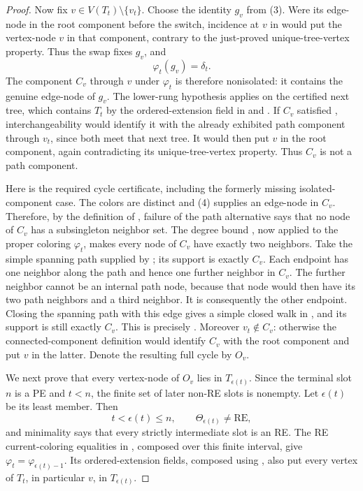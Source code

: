 \begin{proof}
Now fix \(v\in V(T_t)\setminus\{v_t\}\).  Choose the identity \(g_v\)
from (3).  Were its edge-node in the root component before the switch,
incidence at \(v\) in  would put the
vertex-node \(v\) in that component, contrary to the just-proved
unique-tree-vertex property.  Thus the swap fixes \(g_v\), and
\[
                       \varphi_t(g_v)=\delta_t .                 \tag{4}
\]
The component \(C_v\) through \(v\) under \(\varphi_t\) is therefore
nonisolated: it contains the genuine edge-node of \(g_v\).  The lower-rung
hypothesis  applies on the certified next
tree, which contains \(T_t\) by the ordered-extension field in
 and
.  If \(C_v\) satisfied
, interchangeability would identify it
with the already exhibited path component through \(v_t\), since both
meet that next tree.  It would then put \(v\) in the root component,
again contradicting its unique-tree-vertex property.  Thus \(C_v\) is
not a path component.

Here is the required cycle certificate, including the formerly missing
isolated-component case.  The colors are distinct and (4) supplies an
edge-node in \(C_v\).  Therefore, by the definition of
, failure of the path alternative says
that no node of \(C_v\) has a subsingleton neighbor set.  The degree bound
, now applied to the proper
coloring \(\varphi_t\), makes every node of \(C_v\) have exactly two
neighbors.  Take the simple spanning path supplied by
; its support is exactly \(C_v\).
Each endpoint has one neighbor along the path and hence one further
neighbor in \(C_v\).  The further neighbor cannot be an internal path
node, because that node would then have its two path neighbors and a third
neighbor.  It is consequently the other endpoint.  Closing the spanning
path with this edge gives a simple closed walk in
, and its support is still exactly \(C_v\).
This is precisely .  Moreover
\(v_t\notin C_v\): otherwise the connected-component definition
 would identify \(C_v\) with the root
component and put \(v\) in the latter.  Denote the resulting full cycle
by \(O_v\).

We next prove that every vertex-node of \(O_v\) lies in
\(T_{\epsilon(t)}\).  Since the terminal slot \(n\) is a PE and
\(t<n\), the finite set of later non-RE slots is nonempty.  Let
\(\epsilon(t)\) be its least member.  Then
\[
 t<\epsilon(t)\leq n,\qquad
 \Theta_{\epsilon(t)}\ne\mathrm{RE},                            \tag{5}
\]
and minimality says that every strictly intermediate slot is an RE.
The RE current-coloring equalities in
, composed over this finite interval, give
\(\varphi_t=\varphi_{\epsilon(t)-1}\).  Its ordered-extension fields,
composed using , also put every
vertex of \(T_t\), in particular \(v\), in
\(T_{\epsilon(t)}\).


\end{proof}

